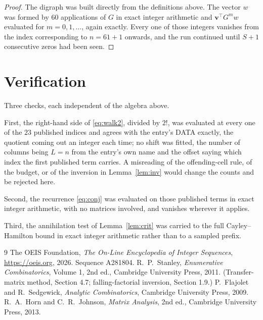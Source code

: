 \documentclass[11pt,a4paper]{article}
\theoremstyle{plain}
\theoremstyle{definition}
\begin{document}
\begin{proof}
The digraph was built directly from the definitions above. The vector $w$ was formed by
$60$ applications of $G$ in exact integer arithmetic and $\mathbf{v}^{\!\top}G^{m}w$
evaluated for $m=0,1,\dots$, again exactly. Every one of those integers vanishes from the
index corresponding to $n=61+1$ onwards, and the run continued until $S+1$ consecutive
zeros had been seen.
\end{proof}

\section{Verification}

Three checks, each independent of the algebra above.

First, the right-hand side of \eqref{eq:walk2}, divided by $2!$, was evaluated at every
one of the $23$ published indices and agrees with the entry's DATA exactly, the quotient
coming out an integer each time; no shift was fitted, the number of columns being
$L=n$ from the entry's own name and the offset saying which index the first published
term carries. A misreading of the offending-cell rule, of the budget, or of the inversion in
Lemma~\ref{lem:inv} would change the counts and be rejected here.

Second, the recurrence \eqref{eq:conj} was evaluated on those published terms in exact
integer arithmetic, with no matrices involved, and vanishes wherever it applies.

Third, the annihilation test of Lemma~\ref{lem:crit} was carried to the full
Cayley--Hamilton bound in exact integer arithmetic rather than to a sampled prefix.

\begin{thebibliography}{9}
 The OEIS Foundation, \emph{The On-Line Encyclopedia of Integer
Sequences}, \url{https://oeis.org}, 2026. Sequence A281804.
 R.~P.~Stanley, \emph{Enumerative Combinatorics}, Volume 1, 2nd ed.,
Cambridge University Press, 2011. (Transfer-matrix method, Section 4.7; falling-factorial
inversion, Section 1.9.)
 P.~Flajolet and R.~Sedgewick, \emph{Analytic Combinatorics}, Cambridge
University Press, 2009.
 R.~A.~Horn and C.~R.~Johnson, \emph{Matrix Analysis}, 2nd ed., Cambridge
University Press, 2013.
\end{thebibliography}
\end{document}
